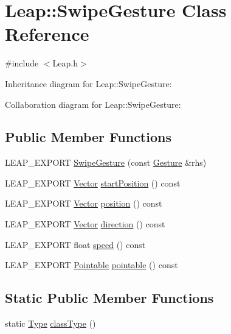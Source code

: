 \hypertarget{class_leap_1_1_swipe_gesture}{}\section{Leap\+:\+:Swipe\+Gesture Class Reference}
\label{class_leap_1_1_swipe_gesture}


{\ttfamily \#include $<$Leap.\+h$>$}



Inheritance diagram for Leap\+:\+:Swipe\+Gesture\+:


Collaboration diagram for Leap\+:\+:Swipe\+Gesture\+:
\subsection*{Public Member Functions}
\begin{DoxyCompactItemize}
\item 
L\+E\+A\+P\+\_\+\+E\+X\+P\+O\+RT \hyperlink{class_leap_1_1_swipe_gesture_ac4698d7bf0a8ef15a92b00866a31fb7f}{Swipe\+Gesture} (const \hyperlink{class_leap_1_1_gesture}{Gesture} \&rhs)
\item 
L\+E\+A\+P\+\_\+\+E\+X\+P\+O\+RT \hyperlink{struct_leap_1_1_vector}{Vector} \hyperlink{class_leap_1_1_swipe_gesture_ad3419098e633523cdc5e4d7e60249f95}{start\+Position} () const
\item 
L\+E\+A\+P\+\_\+\+E\+X\+P\+O\+RT \hyperlink{struct_leap_1_1_vector}{Vector} \hyperlink{class_leap_1_1_swipe_gesture_a74e6f0190ac41b53b944551e5e26a9a4}{position} () const
\item 
L\+E\+A\+P\+\_\+\+E\+X\+P\+O\+RT \hyperlink{struct_leap_1_1_vector}{Vector} \hyperlink{class_leap_1_1_swipe_gesture_aa1adb82cadcaa84121e3991b1a746b55}{direction} () const
\item 
L\+E\+A\+P\+\_\+\+E\+X\+P\+O\+RT float \hyperlink{class_leap_1_1_swipe_gesture_af1f1f368f0a29c2a32f4a8b39a0594e3}{speed} () const
\item 
L\+E\+A\+P\+\_\+\+E\+X\+P\+O\+RT \hyperlink{class_leap_1_1_pointable}{Pointable} \hyperlink{class_leap_1_1_swipe_gesture_a5eebf38d6f7dba3d2f74efaa3b5a5bbb}{pointable} () const
\end{DoxyCompactItemize}
\subsection*{Static Public Member Functions}
\begin{DoxyCompactItemize}
\item 
static \hyperlink{class_leap_1_1_gesture_a6fa6dd4f28c502f0d55abc6b71c6f9b1}{Type} \hyperlink{class_leap_1_1_swipe_gesture_a0dac022eaf599cf5393af9456cb9896e}{class\+Type} ()
\end{DoxyCompactItemize}
